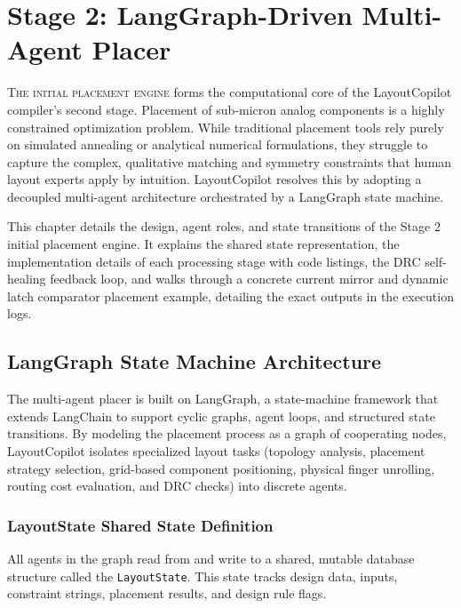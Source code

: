 
\chapter{Stage 2: LangGraph-Driven Multi-Agent Placer}
\label{ch:ai_placement}

\lettrine[lines=3]{T}{he initial placement engine} forms the computational core of the LayoutCopilot compiler's second stage. Placement of sub-micron analog components is a highly constrained optimization problem. While traditional placement tools rely purely on simulated annealing or analytical numerical formulations, they struggle to capture the complex, qualitative matching and symmetry constraints that human layout experts apply by intuition. LayoutCopilot resolves this by adopting a decoupled multi-agent architecture orchestrated by a LangGraph state machine.

This chapter details the design, agent roles, and state transitions of the Stage 2 initial placement engine. It explains the shared state representation, the implementation details of each processing stage with code listings, the DRC self-healing feedback loop, and walks through a concrete current mirror and dynamic latch comparator placement example, detailing the exact outputs in the execution logs.

\section[Multi-Agent Architecture]{LangGraph State Machine Architecture}
\label{sec:agent_arch}

The multi-agent placer is built on LangGraph, a state-machine framework that extends LangChain to support cyclic graphs, agent loops, and structured state transitions. By modeling the placement process as a graph of cooperating nodes, LayoutCopilot isolates specialized layout tasks (topology analysis, placement strategy selection, grid-based component positioning, physical finger unrolling, routing cost evaluation, and DRC checks) into discrete agents.

\subsection{LayoutState Shared State Definition}
All agents in the graph read from and write to a shared, mutable database structure called the \texttt{LayoutState}. This state tracks design data, inputs, constraint strings, placement results, and design rule flags.

